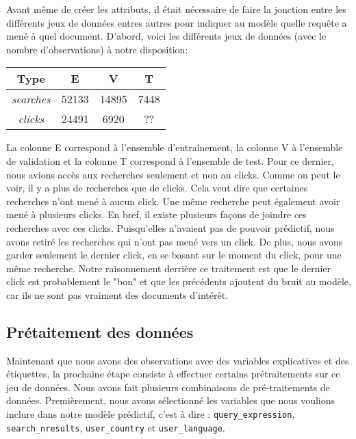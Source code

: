 
Avant même de créer les attributs, il était nécessaire de faire la jonction entre les différents jeux de données entres autres pour indiquer au modèle quelle requête a mené à quel document. 
D'abord, voici les différents jeux de données (avec le nombre d'observations) à notre disposition:

\begin{center}
  \begin{tabular}{ |c|c|c|c| } 
     \hline
     Type & E & V & T \\
     \hline
     \hline
     \textit{searches} & 52133 & 14895 & 7448 \\ 
     \hline
     \textit{clicks} & 24491 & 6920 & ?? \\ 
     \hline
  \end{tabular}
\end{center}

La colonne E correspond à l'ensemble d'entraînement, la colonne V à l'ensemble de validation et la colonne T correspond à l'ensemble de test. 
Pour ce dernier, nous avions accès aux recherches seulement et non au clicks. 
Comme on peut le voir, il y a plus de recherches que de clicks. 
Cela veut dire que certaines recherches n'ont mené à aucun click. 
Une même recherche peut également avoir mené à plusieurs clicks. 
En bref, il existe plusieurs façons de joindre ces recherches avec ces clicks. 
Puisqu'elles n'avaient pas de pouvoir prédictif, nous avons retiré les recherches qui n'ont pas mené vers un click. 
De plus, nous avons garder seulement le dernier click, en se basant sur le moment du click, pour une même recherche. 
Notre raisonnement derrière ce traitement est que le dernier click est probablement le "bon" et que les précédents ajoutent du bruit au modèle, car ils ne sont pas vraiment des documents d'intérêt.

\subsection{Prétaitement des données}

Maintenant que nous avons des observations avec des variables explicatives et des étiquettes, la prochaine étape consiste à effectuer certains prétraitements sur ce jeu de données. Nous avons fait plusieurs combinaisons de pré-traitements de données. Premièrement, nous avons sélectionné les variables que nous voulions inclure dans notre modèle prédictif, c'est à dire : \texttt{query\_expression}, \texttt{search\_nresults}, \texttt{user\_country} et \texttt{user\_language}.

